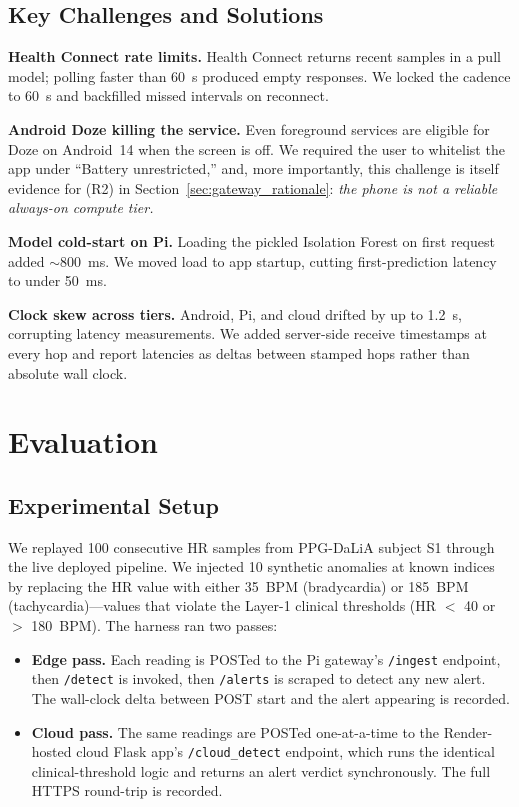 \documentclass[conference]{IEEEtran}
\begin{document}
\subsection{Key Challenges and Solutions}

\textbf{Health Connect rate limits.} Health Connect returns recent samples in a pull model; polling faster than 60~s produced empty responses. We locked the cadence to 60~s and backfilled missed intervals on reconnect.

\textbf{Android Doze killing the service.} Even foreground services are eligible for Doze on Android~14 when the screen is off. We required the user to whitelist the app under ``Battery unrestricted,'' and, more importantly, this challenge is itself evidence for (R2) in Section~\ref{sec:gateway_rationale}: \textit{the phone is not a reliable always-on compute tier.}

\textbf{Model cold-start on Pi.} Loading the pickled Isolation Forest on first request added $\sim$800~ms. We moved load to app startup, cutting first-prediction latency to under 50~ms.

\textbf{Clock skew across tiers.} Android, Pi, and cloud drifted by up to 1.2~s, corrupting latency measurements. We added server-side receive timestamps at every hop and report latencies as deltas between stamped hops rather than absolute wall clock.

\section{Evaluation}

\subsection{Experimental Setup}

We replayed 100 consecutive HR samples from PPG-DaLiA subject S1 through the live deployed pipeline. We injected 10 synthetic anomalies at known indices by replacing the HR value with either 35~BPM (bradycardia) or 185~BPM (tachycardia)---values that violate the Layer-1 clinical thresholds (HR $<$ 40 or $>$ 180~BPM). The harness ran two passes:

\begin{itemize}
    \item \textbf{Edge pass.} Each reading is POSTed to the Pi gateway's \texttt{/ingest} endpoint, then \texttt{/detect} is invoked, then \texttt{/alerts} is scraped to detect any new alert. The wall-clock delta between POST start and the alert appearing is recorded.
    \item \textbf{Cloud pass.} The same readings are POSTed one-at-a-time to the Render-hosted cloud Flask app's \texttt{/cloud\_detect} endpoint, which runs the identical clinical-threshold logic and returns an alert verdict synchronously. The full HTTPS round-trip is recorded.
\end{itemize}
\end{document}
